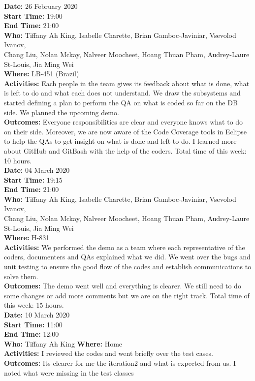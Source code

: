 \documentclass[12pt]{article}
\begin{document}
{\bf Date:} 26 February 2020\\
{\bf Start Time:} 19:00\\
{\bf End Time:} 21:00\\
{\bf Who:} Tiffany Ah King, Isabelle Charette, Brian Gamboc-Javiniar, Vsevolod Ivanov,\\
Chang Liu, Nolan Mckay, Nalveer Moocheet, Hoang Thuan Pham, Audrey-Laure St-Louis, Jia Ming Wei\\
{\bf Where:} LB-451 (Brazil)\\
{\bf Activities:} Each people in the team gives its feedback about what is done, what is left to do and what each does not understand. We draw the subsystems and started defining a plan to perform the QA on what is coded so far on the DB side. We planned the upcoming demo.\\
{\bf Outcomes:} Everyone responsibilities are clear and everyone knows what to do on their side. Moreover, we are now aware of the Code Coverage tools in Eclipse to help the QAs to get insight on what is done and left to do. I learned more about GitHub and GitBash with the help of the coders. Total time of this week: 10 hours.\\

{\bf Date:} 04 March 2020\\
{\bf Start Time:} 19:15\\
{\bf End Time:} 21:00\\
{\bf Who:} Tiffany Ah King, Isabelle Charette, Brian Gamboc-Javiniar, Vsevolod Ivanov,\\
Chang Liu, Nolan Mckay, Nalveer Moocheet, Hoang Thuan Pham, Audrey-Laure St-Louis, Jia Ming Wei\\
{\bf Where:} H-831\\
{\bf Activities:} We performed the demo as a team where each representative of the coders, documenters and QAs explained what we did. We went over the bugs and unit testing to ensure the good flow of the codes and establish communications to solve them.\\
{\bf Outcomes:} The demo went well and everything is clearer. We still need to do some changes or add more comments but we are on the right track.  Total time of this week: 15 hours.\\


{\bf Date:} 10 March 2020\\
{\bf Start Time:} 11:00 \\
{\bf End Time:} 12:00\\
{\bf Who:} Tiffany Ah King
{\bf Where:} Home\\
{\bf Activities:} I reviewed the codes and went briefly over the test cases. \\
{\bf Outcomes:} Its clearer for me the iteration2 and what is expected from us. I noted what were missing in the test classes\\
\end{document}
